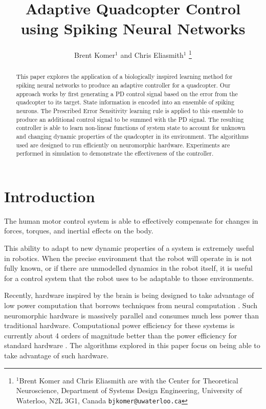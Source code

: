 \documentclass[letterpaper, 10 pt, conference]{ieeeconf}  %
\title{\LARGE \bf
Adaptive Quadcopter Control using Spiking Neural Networks
}
\author{Brent Komer$^{1}$ and Chris Eliasmith$^{1}$%
\thanks{$^{1}$Brent Komer and Chris Eliasmith are with the Center for Theoretical Neuroscience, Department of Systems Design Engineering,
        University of Waterloo, N2L 3G1, Canada
        {\tt\small bjkomer@uwaterloo.ca}}%
}
\begin{document}
\maketitle
\thispagestyle{empty}
\pagestyle{empty}


\begin{abstract}

This paper explores the application of a biologically inspired learning method for spiking neural networks to produce an adaptive controller for a quadcopter.
Our approach works by first generating a PD control signal based on the error from the quadcopter to its target.
State information is encoded into an ensemble of spiking neurons.
The Prescribed Error Sensitivity learning rule is applied to this ensemble to produce an additional control signal to be summed with the PD signal.
The resulting controller is able to learn non-linear functions of system state to account for unknown and changing dynamic properties of the quadcopter in its environment.
The algorithms used are designed to run efficiently on neuromorphic hardware.
Experiments are performed in simulation to demonstrate the effectiveness of the controller.

\end{abstract}


\section{Introduction}

The human motor control system is able to effectively compensate for changes in forces, torques, and inertial effects on the body.

This ability to adapt to new dynamic properties of a system is extremely useful in robotics.
When the precise environment that the robot will operate in is not fully known, or if there are unmodelled dynamics in the robot itself, it is useful for a control system that the robot uses to be adaptable to those environments.

Recently, hardware inspired by the brain is being designed to take advantage of low power computation that borrows techniques from neural computation \cite{hasler2013finding, khan2008spinnaker, boahen2006neurogrid}. %
Such neuromorphic hardware is massively parallel and consumes much less power than traditional hardware.
Computational power efficiency for these systems is currently about 4 orders of magnitude better than the power efficiency for standard hardware \cite{hasler2013finding}.
The algorithms explored in this paper focus on being able to take advantage of such hardware.
\end{document}
